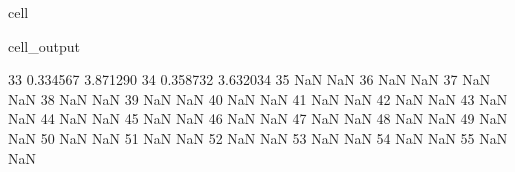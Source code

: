 \documentclass[letterpaper,10pt,english]{jupyterBook}
\begin{document}
\begin{sphinxuseclass}{cell}
\begin{sphinxVerbatimOutput}
\begin{sphinxuseclass}{cell_output}
\begin{sphinxVerbatim}[commandchars=\\\{\}]
					33                0.334567                    \PYGZhy{}3.871290   
					34                0.358732                    \PYGZhy{}3.632034   
					35                     NaN                          NaN   
					36                     NaN                          NaN   
					37                     NaN                          NaN   
					38                     NaN                          NaN   
					39                     NaN                          NaN   
					40                     NaN                          NaN   
					41                     NaN                          NaN   
					42                     NaN                          NaN   
					43                     NaN                          NaN   
					44                     NaN                          NaN   
					45                     NaN                          NaN   
					46                     NaN                          NaN   
					47                     NaN                          NaN   
					48                     NaN                          NaN   
					49                     NaN                          NaN   
					50                     NaN                          NaN   
					51                     NaN                          NaN   
					52                     NaN                          NaN   
					53                     NaN                          NaN   
					54                     NaN                          NaN   
					55                     NaN                          NaN   
					

\end{sphinxVerbatim}
\end{sphinxuseclass}
\end{sphinxVerbatimOutput}
\end{sphinxuseclass}
\end{document}
